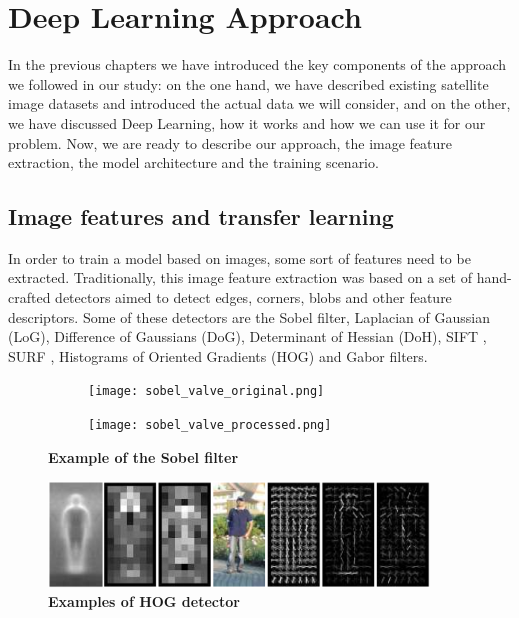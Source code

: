 
\chapter{Deep Learning Approach}

\label{Chapter4}


In the previous chapters we have introduced the key components of the approach we followed in our study: on the one hand, we have described existing satellite image datasets and introduced the actual data we will consider, and on the other, we have discussed Deep Learning, how it works and how we can use it for our problem. Now, we are ready to describe our approach, the image feature extraction, the model architecture and the training scenario.

\section{Image features and transfer learning}\label{sec:transferLearning}

In order to train a model based on images, some sort of features need to be extracted. Traditionally, this image feature extraction was based on a set of hand-crafted detectors aimed to detect edges, corners, blobs and other feature descriptors. Some of these detectors are the Sobel filter, Laplacian of Gaussian (LoG), Difference of Gaussians (DoG), Determinant of Hessian (DoH), SIFT \parencite{Lowe1999,Lowe2004}, SURF \parencite{Bay2006}, Histograms of Oriented Gradients (HOG) \parencite{Dalal2005} and Gabor filters.

\begin{figure}[h!]
	\centering
	\begin{subfigure}{.5\textwidth}
  		\centering
  		\texttt{[image: sobel\_valve\_original.png]}
	\end{subfigure}%
	\begin{subfigure}{.5\textwidth}
  		\centering
  		\texttt{[image: sobel\_valve\_processed.png]}
	\end{subfigure}
	\captionsetup{width=1\linewidth}
	\caption{\textbf{Example of the Sobel filter}}
	\label{fig:sobel}
\end{figure}

\begin{figure}[h!]
	\centering
	\includegraphics[width=0.9\textwidth]{Figures/hog_example.png}
	\captionsetup{width=1\linewidth}
	\caption{\textbf{Examples of HOG detector \parencite{Dalal2005}}}
	\label{fig:hog}
\end{figure}

